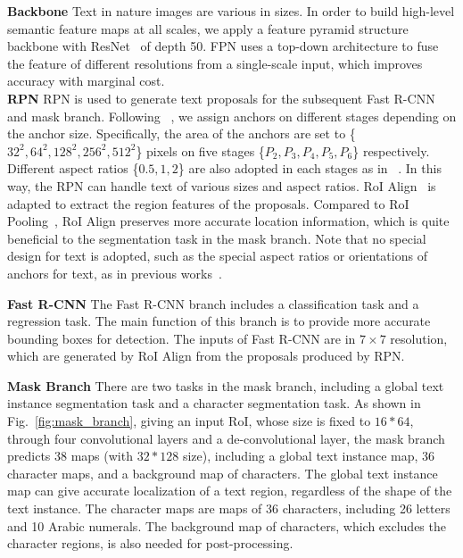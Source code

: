 \documentclass[runningheads]{llncs}
\begin{document}
\noindent\textbf{Backbone} Text in nature images are various in sizes. In order to build high-level semantic feature maps at all scales, we apply a feature pyramid structure~\cite{lin2017feature} backbone with ResNet~\cite{resnet} of depth 50.
FPN uses a top-down architecture to fuse the feature of different resolutions from a single-scale input,  which improves accuracy with marginal cost.
\\
\textbf{RPN}
RPN is used to generate text proposals for the subsequent Fast R-CNN and mask branch. Following ~\cite{lin2017feature}, we assign anchors on different stages depending on the anchor size. Specifically, the area of the anchors are set to \{$32^2, 64^2, 128^2, 256^2, 512^2$\} pixels on five stages \{$P_2, P_3, P_4, P_5, P_6$\} respectively. Different aspect ratios \{$0.5,1,2$\} are also adopted in each stages as in ~\cite{ren2015faster}. In this way, the RPN can handle text of various sizes and aspect ratios. RoI Align~\cite{he2017mask} is adapted to extract the region features of the proposals. Compared to RoI Pooling~\cite{fastrcnn}, RoI Align preserves more accurate location information, which is quite beneficial to the segmentation task in the mask branch. Note that no special design for text is adopted, such as the special aspect ratios or orientations of anchors for text, as in previous works~\cite{liao2017textboxes,he2017single,liu2017deep}.

\noindent\textbf{Fast R-CNN}
The Fast R-CNN branch includes a classification task and a regression task. The main function of this branch is to provide more accurate bounding boxes for detection. The inputs of Fast R-CNN are in $7 \times 7$ resolution, which are generated by RoI Align from the proposals produced by RPN.

\noindent\textbf{Mask Branch}
There are two tasks in the mask branch, including a global text instance segmentation task and a character segmentation task. As shown in Fig.~\ref{fig:mask_branch}, giving an input RoI, whose size is fixed to $16*64$, through four convolutional layers and a de-convolutional layer, the mask branch predicts 38 maps (with $32*128$ size), including a global text instance map, 36 character maps, and a background map of characters. 
The global text  instance map can give accurate localization of a text region, regardless of the shape of the text instance.
The character maps are maps of 36 characters, including 26 letters and 10 Arabic numerals. The background map of characters, which excludes the character regions, is also needed for post-processing.
\end{document}
